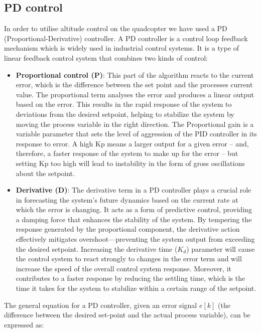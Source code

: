 \documentclass{report}
\begin{document}
\subsection{PD control}\label{PD_control} In order to utilise altitude
control on the quadcopter we have used a PD (Proportional-Derivative)
controller. A PD controller is a control loop feedback mechanism which is widely
used in industrial control systems. It is a type of linear feedback control
system that combines two kinds of control:
\begin{itemize}
  \item \textbf{Proportional control (P)}: This part of the algorithm reacts to
  the current error, which is the difference between the set point and the
  processes current value. The proportional term analyses the error and produces
  a linear output based on the error. This results in the rapid response of the
  system to deviations from the desired setpoint, helping to stabilize the
  system by moving the process variable in the right direction. The Proportional
  gain is a variable parameter that sets the level of aggression of the PID
  controller in its response to error. A high Kp means a larger output for
  a given error – and, therefore, a faster response of the system to make up for
  the error – but setting Kp too high will lead to instability in the form of
  gross oscillations about the setpoint.
  \item \textbf{Derivative (D)}: The derivative term in a PD controller plays a
  crucial role in forecasting the system's future dynamics based on the current
  rate at which the error is changing. It acts as a form of predictive control,
  providing a damping force that enhances the stability of the system. By
  tempering the response generated by the proportional component, the derivative
  action effectively mitigates overshoot—preventing the system output from
  exceeding the desired setpoint. Increasing the derivative time (\(K_d\)) parameter
  will cause the control system to react strongly to changes in the error term
  and will increase the speed of the overall control system response. Moreover,
  it contributes to a faster response by reducing the settling time, which is
  the time it takes for the system to stabilize within a certain range of the
  setpoint.
\end{itemize}
The general equation for a PD controller, given an error signal \(e[k]\) (the
difference between the desired set-point and the actual process variable), can be
expressed as:
\end{document}

